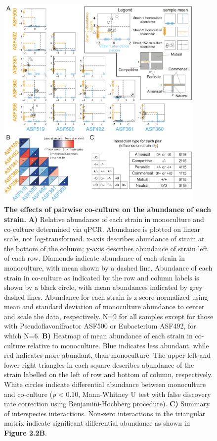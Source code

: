 \documentclass[11pt,twocolumn,notitlepage,openany,twoside]{book}
\begin{document}
\begin{refsection}
\begin{figure}
\centering
\includegraphics[width=0.9\textwidth]{ch2_fig2}
\caption[The effects of pairwise co-culture on the abundance of each strain.]{\textbf{The effects of pairwise co-culture on the abundance of each strain.} \textbf{A)} Relative abundance of each strain in monoculture and co-culture determined via qPCR. Abundance is plotted on linear scale, not log-transformed. x-axis describes abundance of strain at the bottom of the column; y-axis describes abundance of strain left of each row. Diamonds indicate abundance of each strain in monoculture, with mean shown by a dashed line. Abundance of each strain in co-culture as indicated by the row and column labels is shown by a black circle, with mean abundances indicated by grey dashed lines. Abundance for each strain is z-score normalized using mean and standard deviation of monoculture abundance to center and scale the data, respectively. N=9 for all samples except for those with Pseudoflavonifractor ASF500 or Eubacterium ASF492, for which N=6. \textbf{B)} Heatmap of mean abundance of each strain in co-culture relative to monoculture. Blue indicates less abundant, while red indicates more abundant, than monoculture. The upper left and lower right triangles in each square describes abundance of the strain labelled on the left of row and bottom of column, respectively. White circles indicate differential abundance between monoculture and co-culture (\textit{p} < 0.10, Mann-Whitney U test with false discovery rate correction using Benjamini-Hochberg procedure). \textbf{C)} Summary of interspecies interactions. Non-zero interactions in the triangular matrix indicate significant differential abundance as shown in \textbf{Figure 2.2B}.}
\end{figure}


\end{refsection}
\end{document}
